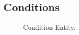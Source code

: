 %
%
%
%
%

\subsection{Conditions}\label{sec:conditions}

\begin{figure}[H]
	\begin{center}
	\end{center}
	\caption{Condition Entity.}\label{fig:condition_entity}
\end{figure}

